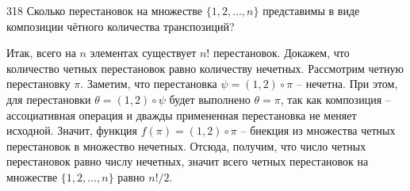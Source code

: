 \begin{task}{318}
Сколько перестановок на множестве $\{1,2,\dots,n\}$ представимы в виде композиции чётного количества транспозиций?
\end{task}

\begin{solution}
Итак, всего на $n$ элементах существует $n!$ перестановок. Докажем, что количество четных перестановок равно количеству нечетных. Рассмотрим четную перестановку $\pi$. Заметим, что перестановка $\psi=(1,2)∘\pi$ -- нечетна. При этом, для перестановки $\theta=(1,2)∘\psi$ будет выполнено $\theta=\pi$, так как композиция -- ассоциативная операция и дважды примененная перестановка не меняет исходной. Значит, функция $f(\pi)=(1,2)∘\pi$ -- биекция из множества четных перестановок в множество нечетных. Отсюда, получим, что число четных перестановок равно числу нечетных, значит всего четных перестановок на множестве $\{1,2,\dots,n\}$ равно $n!/2$.
\end{solution}
